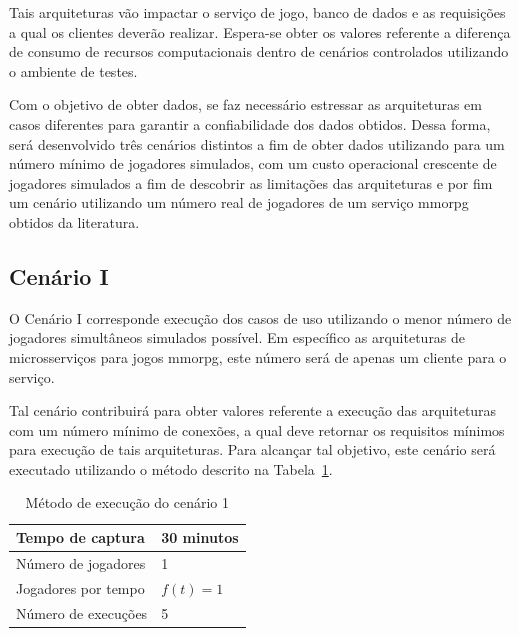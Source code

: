Tais arquiteturas vão impactar o serviço de jogo, banco de dados e as requisições a qual os clientes deverão realizar.
%
Espera-se obter os valores referente a diferença de consumo de recursos computacionais dentro de cenários controlados utilizando o ambiente de testes.



Com o objetivo de obter dados, se faz necessário estressar as arquiteturas em casos diferentes para garantir a confiabilidade dos dados obtidos.
%
Dessa forma, será desenvolvido três cenários distintos a fim de obter dados utilizando para um número mínimo de jogadores simulados, com um custo operacional crescente de jogadores simulados a fim de descobrir as limitações das arquiteturas e por fim um cenário utilizando um número real de jogadores de um serviço \ac{mmorpg} obtidos da literatura.



\subsection{Cenário I}



O Cenário I corresponde execução dos casos de uso utilizando o menor número de jogadores simultâneos simulados possível.
%
Em específico as arquiteturas de microsserviços para jogos \ac{mmorpg}, este número será de apenas um cliente para o serviço.



Tal cenário contribuirá para obter valores referente a execução das arquiteturas com um número mínimo de conexões, a qual deve retornar os requisitos mínimos para execução de tais arquiteturas.
%
Para alcançar tal objetivo, este cenário será executado utilizando o método descrito na Tabela~\ref{tab:cenario_1}.

\begin{table}[htb!]
\centering
\caption{Método de execução do cenário 1}
\label{tab:cenario_1}
\begin{tabular}{|l|l|}
\hline
Tempo de captura    & 30 minutos \\ \hline
Número de jogadores & 1          \\ \hline
Jogadores por tempo & $f(t) = 1$ \\ \hline
Número de execuções & 5          \\ \hline 
\end{tabular}
\end{table}



